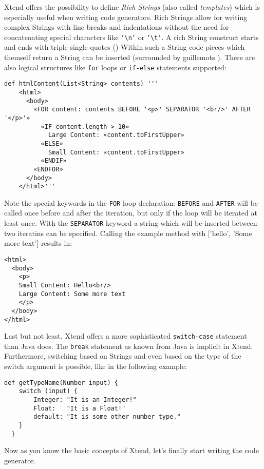 Xtend offers the possibility to define \emph{Rich Strings} (also called \emph{templates})
which is especially useful when writing code generators. Rich Strings allow for
writing complex Strings with line breaks and indentations without the need for
concatenating special characters like \texttt{'\textbackslash n'} or \texttt{'\textbackslash t'}. A rich String
construct starts and ends with triple single quotes
(\textquotesingle\textquotesingle\textquotesingle) Within such a String code
pieces which themself return a String can be inserted (surrounded by guillemots
\texttt{\guillemotleft\guillemotright}).
There are also logical structures like \texttt{for} loops or \texttt{if-else}
statements supported:

\begin{lstlisting}[language=Xtend]
  def htmlContent(List<String> contents) '''
  	<html>
  	  <body>
  	    «FOR content: contents BEFORE '<p>' SEPARATOR '<br/>' AFTER '</p>'»
  	      «IF content.length > 10»
  	        Large Content: «content.toFirstUpper»
  	      «ELSE»
  	        Small Content: «content.toFirstUpper»
  	      «ENDIF»
  	    «ENDFOR»
  	  </body>
  	</html>'''
\end{lstlisting}

Note the special keywords in the \texttt{FOR} loop declaration: \texttt{BEFORE} 
and \texttt{AFTER} will be called once before and after the iteration, but only
if the loop will be iterated at least once. With the \texttt{SEPARATOR} keyword
a string which will be inserted between two iteratins can be specified. Calling 
the example method with ['hello', 'Some more text'] results in:

\begin{lstlisting}[language=Xtend]
<html>
  <body>
    <p>
    Small Content: Hello<br/>
    Large Content: Some more text
    </p>
  </body>
</html>
\end{lstlisting}

Last but not least, Xtend offers a more sophisticated \texttt{switch-case} statement
than Java does. The \texttt{break} statement as known from Java is implicit in Xtend.
Furthermore, switching based on Strings and even based on the type of the switch
argument is possible, like in the following example:

\begin{lstlisting}[language=Xtend]
  def getTypeName(Number input) {
  	switch (input) {
  		Integer: "It is an Integer!"
  		Float:   "It is a Float!"
  		default: "It is some other number type."
  	}
  }
\end{lstlisting}

Now as you know the basic concepts of Xtend, let's finally start writing the code
generator.
